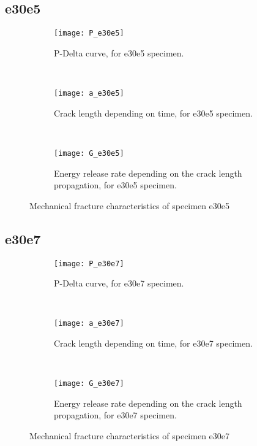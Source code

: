 \subsection{e30e5}

\begin{figure}[H]
	\centering
	\begin{subfigure}{0.48\linewidth}
		\centering
		\texttt{[image: P\_e30e5]}
		\decoRule
		\caption{P-Delta curve, for e30e5 specimen.}
		\label{fig:P_e30e5}
	\end{subfigure}
	\hfill \\
	\begin{subfigure}{0.48\linewidth}
		\centering
		\texttt{[image: a\_e30e5]}
		\decoRule
		\caption{Crack length depending on time, for e30e5 specimen.}
		\label{fig:a_e30e5}
	\end{subfigure}
	\hfill\\
	\begin{subfigure}{0.48\linewidth}
		\centering
		\texttt{[image: G\_e30e5]}
		\decoRule
		\caption{Energy release rate depending on the crack length propagation, for e30e5 specimen.}
		\label{fig:G_e30e5}
	\end{subfigure}
	\caption{Mechanical fracture characteristics of specimen e30e5}
	\label{E1o_a}
\end{figure}

\subsection{e30e7}

\begin{figure}[H]
	\centering
	\begin{subfigure}{0.48\linewidth}
		\centering
		\texttt{[image: P\_e30e7]}
		\decoRule
		\caption{P-Delta curve, for e30e7 specimen.}
		\label{fig:P_e30e7}
	\end{subfigure}
	\hfill \\
	\begin{subfigure}{0.48\linewidth}
		\centering
		\texttt{[image: a\_e30e7]}
		\decoRule
		\caption{Crack length depending on time, for e30e7 specimen.}
		\label{fig:a_e30e7}
	\end{subfigure}
	\hfill\\
	\begin{subfigure}{0.48\linewidth}
		\centering
		\texttt{[image: G\_e30e7]}
		\decoRule
		\caption{Energy release rate depending on the crack length propagation, for e30e7 specimen.}
		\label{fig:G_e30e7}
	\end{subfigure}
	\caption{Mechanical fracture characteristics of specimen e30e7}
	\label{E1o_a}
\end{figure}





